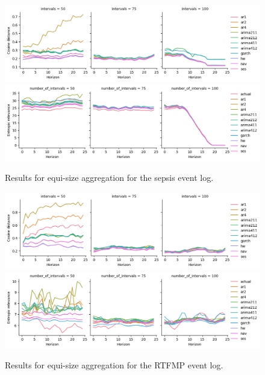 \begin{figure}
    \centering
    \includegraphics[width=\textwidth]{img/sepsis_cosine_equitemp.png}
    \includegraphics[width=\textwidth]{img/sepsis_entropic_equitemp.png}
    \caption{Results for equi-size aggregation for the sepsis event log.}
    \label{fig:sepsis_equitemp}
\end{figure}

\begin{figure}
    \centering
    \includegraphics[width=\textwidth]{img/rtfmp_cosine_equitemp.png}
    \includegraphics[width=\textwidth]{img/rtfmp_entropic_equitemp.png}
    \caption{Results for equi-size aggregation for the RTFMP event log.}
    \label{fig:rtfmp_equitemp}
\end{figure}


